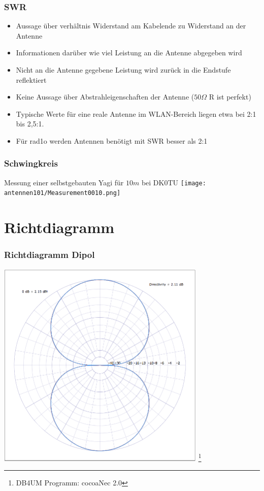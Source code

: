 \begin{frame}
    \frametitle{SWR}
    \begin{center}
	\begin{itemize}
		\item Aussage über verhältnis Widerstand am Kabelende zu Widerstand an der Antenne
		\item Informationen darüber wie viel Leistung an die Antenne abgegeben wird
		\item Nicht an die Antenne gegebene Leistung wird zurück in die Endstufe reflektiert
		\item Keine Aussage über Abstrahleigenschaften der Antenne ($50 \Omega$ R ist perfekt)
		\item Typische Werte für eine reale Antenne im WLAN-Bereich liegen etwa bei 2:1 bis 2,5:1.
		\item Für rad1o werden Antennen benötigt mit SWR besser als 2:1
    \end{itemize}
 	\end{center}
\end{frame}

\begin{frame}
    \frametitle{Schwingkreis}
    \begin{center} \large
    Messung einer selbstgebauten Yagi für $10m$ bei DK0TU
        \texttt{[image: antennen101/Measurement0010.png]}
	\end{center}
\end{frame}


\section*{Richtdiagramm}

\begin{frame}
    \frametitle{Richtdiagramm Dipol}
    \begin{center}
        \includegraphics[width=0.75\textwidth]{e11/Richt-Dipol.png}
        \footnote{\tiny DB4UM Programm: cocoaNec 2.0}
	\end{center}
\end{frame}

